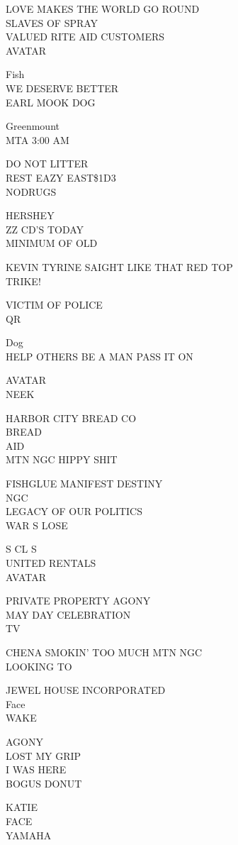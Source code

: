 \documentclass[10pt,letterpaper]{article}
\begin{document}
LOVE MAKES THE WORLD GO ROUND\\
SLAVES OF SPRAY\\
VALUED RITE AID CUSTOMERS\\
AVATAR

Fish\\
WE DESERVE BETTER\\
EARL MOOK DOG

Greenmount\\
MTA 3:00 AM

DO NOT LITTER\\
REST EAZY EAST\$1D3\\
NODRUGS

HERSHEY\\
ZZ CD'S TODAY\\
MINIMUM OF OLD

KEVIN TYRINE SAIGHT LIKE THAT RED TOP\\
TRIKE!

VICTIM OF POLICE\\
QR

Dog\\
HELP OTHERS BE A MAN PASS IT ON

AVATAR\\
NEEK

HARBOR CITY BREAD CO\\
BREAD\\
AID\\
MTN NGC HIPPY SHIT

FISHGLUE MANIFEST DESTINY\\
NGC\\
LEGACY OF OUR POLITICS\\
WAR S LOSE

S CL S\\
UNITED RENTALS\\
AVATAR

PRIVATE PROPERTY AGONY\\
MAY DAY CELEBRATION\\
TV

CHENA SMOKIN' TOO MUCH MTN NGC\\
LOOKING TO

JEWEL HOUSE INCORPORATED\\
Face\\
WAKE

AGONY\\
LOST MY GRIP\\
I WAS HERE\\
BOGUS DONUT

KATIE\\
FACE\\
YAMAHA
\end{document}

